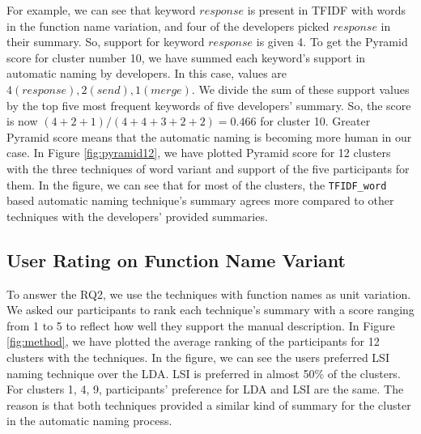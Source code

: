 For example, we can see that keyword $response$ is present in TFIDF with words in the function name variation, and four of the developers picked $response$ in their summary. So, support for keyword $response$ is given 4. To get the Pyramid score for cluster number 10, we have summed each keyword's support in automatic naming by developers. In this case, values are $4(response), 2(send), 1(merge)$. We divide the sum of these support values by the top five most frequent keywords of five developers' summary. So, the score is now $(4+2+1)/(4+4+3+2+2) = 0.466 $ for cluster 10. Greater Pyramid score means that the automatic naming is becoming more human in our case. In Figure \ref{fig:pyramid12}, we have plotted Pyramid score for 12 clusters with the three techniques of word variant and support of the five participants for them. In the figure, we can see that for most of the clusters, the \texttt{TFIDF\_word} based automatic naming technique's summary agrees more compared to other techniques with  the developers' provided summaries.



\subsection{User Rating on Function Name Variant}
To answer the RQ2, we use the techniques with function names as unit variation. We asked our participants to rank each technique's summary with a score ranging from 1 to 5 to reflect how well they support the manual description. In Figure \ref{fig:method}, we have plotted the average ranking of the participants for 12 clusters with the techniques. In the figure, we can see the users preferred LSI naming technique over the LDA. LSI is preferred in almost 50\% of the clusters. For clusters 1, 4, 9, participants' preference for LDA and LSI are the same. The reason is that both techniques provided a similar kind of summary for the cluster in the automatic naming process.



